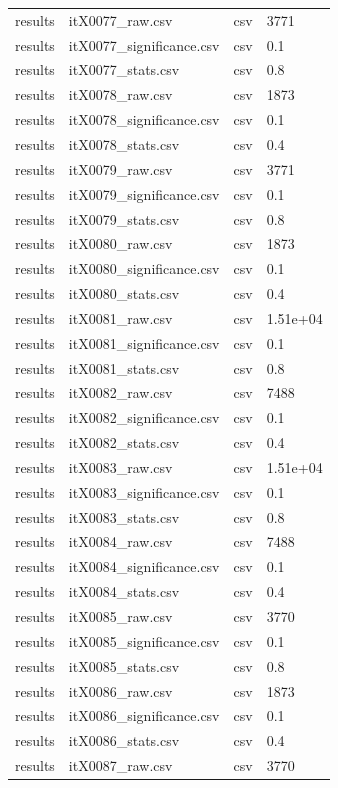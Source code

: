 \begin{landscape}
\begin{longtable}{p{}p{}p{}p{}}
results & itX0077\_raw.csv & csv & 3771 \\
results & itX0077\_significance.csv & csv & 0.1 \\
results & itX0077\_stats.csv & csv & 0.8 \\
results & itX0078\_raw.csv & csv & 1873 \\
results & itX0078\_significance.csv & csv & 0.1 \\
results & itX0078\_stats.csv & csv & 0.4 \\
results & itX0079\_raw.csv & csv & 3771 \\
results & itX0079\_significance.csv & csv & 0.1 \\
results & itX0079\_stats.csv & csv & 0.8 \\
results & itX0080\_raw.csv & csv & 1873 \\
results & itX0080\_significance.csv & csv & 0.1 \\
results & itX0080\_stats.csv & csv & 0.4 \\
results & itX0081\_raw.csv & csv & 1.51e+04 \\
results & itX0081\_significance.csv & csv & 0.1 \\
results & itX0081\_stats.csv & csv & 0.8 \\
results & itX0082\_raw.csv & csv & 7488 \\
results & itX0082\_significance.csv & csv & 0.1 \\
results & itX0082\_stats.csv & csv & 0.4 \\
results & itX0083\_raw.csv & csv & 1.51e+04 \\
results & itX0083\_significance.csv & csv & 0.1 \\
results & itX0083\_stats.csv & csv & 0.8 \\
results & itX0084\_raw.csv & csv & 7488 \\
results & itX0084\_significance.csv & csv & 0.1 \\
results & itX0084\_stats.csv & csv & 0.4 \\
results & itX0085\_raw.csv & csv & 3770 \\
results & itX0085\_significance.csv & csv & 0.1 \\
results & itX0085\_stats.csv & csv & 0.8 \\
results & itX0086\_raw.csv & csv & 1873 \\
results & itX0086\_significance.csv & csv & 0.1 \\
results & itX0086\_stats.csv & csv & 0.4 \\
results & itX0087\_raw.csv & csv & 3770 \\

\end{longtable}
\end{landscape}
